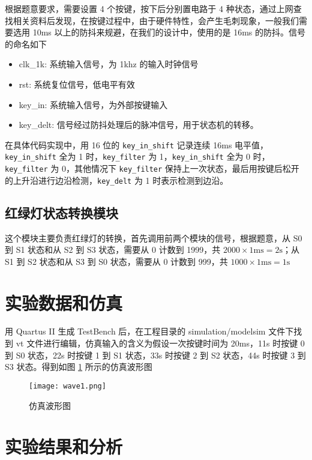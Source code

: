 \documentclass[12pt,AutoFakeBold]{article}
\begin{document}
根据题意要求，需要设置 4 个按键，按下后分别置电路于 4 种状态，通过上网查找相关资料后发现，在按键过程中，由于硬件特性，会产生毛刺现象，一般我们需要选用 10ms 以上的防抖来规避，在我们的设计中，使用的是 16ms 的防抖。信号的命名如下
%
\begin{itemize}
	\item clk\_1k: 系统输入信号，为 1khz 的输入时钟信号
	\item rst: 系统复位信号，低电平有效
	\item key\_in: 系统输入信号，为外部按键输入
	\item key\_delt: 信号经过防抖处理后的脉冲信号，用于状态机的转移。
\end{itemize}
%
在具体代码实现中，用 16 位的 \lstinline[language=Verilog]|key_in_shift| 记录连续 16ms 电平值，\lstinline[language=Verilog]|key_in_shift| 全为 1 时，\lstinline[language=Verilog]|key_filter| 为 1，\lstinline[language=Verilog]|key_in_shift| 全为 0 时，\lstinline[language=Verilog]|key_filter| 为 0，其他情况下 \lstinline[language=Verilog]|key_filter| 保持上一次状态，最后用按键后松开的上升沿进行边沿检测，\lstinline[language=Verilog]|key_delt| 为 1 时表示检测到边沿。

\subsection{红绿灯状态转换模块}

这个模块主要负责红绿灯的转换，首先调用前两个模块的信号，根据题意，从 S0 到 S1 状态和从 S2 到 S3 状态，需要从 0 计数到 1999，共 $2000\times1\mathrm{ms}=2\mathrm{s}$；从 S1 到 S2 状态和从 S3 到 S0 状态，需要从 0 计数到 999，共 $1000\times1\mathrm{ms}=1\mathrm{s}$

\section{实验数据和仿真}

用 Quartus II 生成 TestBench 后，在工程目录的 simulation/modelsim 文件下找到 vt 文件进行编辑，仿真输入的含义为假设一次按键时间为 20ms，11s 时按键 0 到 S0 状态，22s 时按键 1 到 S1 状态，33s 时按键 2 到 S2 状态，44s 时按键 3 到 S3 状态。得到如图 \ref{fig:wave1} 所示的仿真波形图

\begin{figure}[hbtp]
	\centering
	\texttt{[image: wave1.png]}
	\caption{仿真波形图}\label{fig:wave1}
\end{figure}

\section{实验结果和分析}
\end{document}
